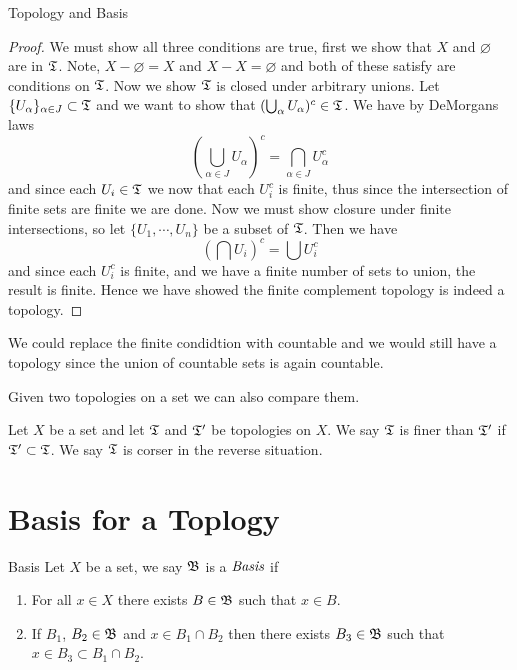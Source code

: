 \begin{chapter}{Topology and Basis}
    
    \begin{proof}
        We must show all three conditions are true, first we show that $X$ and $\varnothing$ are in $\mathfrak{T}$. Note, $X-\varnothing = X$ and $X - X = \varnothing$ and both of 
        these satisfy are conditions on $\mathfrak{T}$. Now we show $\mathfrak{T}$ is closed under arbitrary unions. Let $\{U_\alpha\}_{\alpha \in J} \subset \mathfrak{T}$ and we want to show that 
        $(\bigcup_{\alpha} U_\alpha)^c \in \mathfrak{T}$. We have by DeMorgans laws 
        \[(\bigcup_{\alpha \in J} U_\alpha)^c = \bigcap_{\alpha \in J} U_\alpha^c \]
        and since each $U_i \in \mathfrak{T}$ we now that each $U_i^c$ is finite, thus since the intersection of finite sets are finite we are done. Now we must show closure under finite 
        intersections, so let $\{U_1, \dotsb, U_n \}$ be a subset of $\mathfrak{T}$. Then we have 
        \[(\bigcap U_i)^c = \bigcup U_i^c \]
        and since each $U_i^c$ is finite, and we have a finite number of sets to union, the result is finite. Hence we have showed the finite complement topology is indeed a 
        topology. 
    \end{proof}

    We could replace the finite condidtion with countable and we would still have a topology since the union of countable sets is again 
    countable. 

    Given two topologies on a set we can also compare them. 
    
    \begin{defn}
        Let $X$ be a set and let $\mathfrak{T}$ and $\mathfrak{T}^\prime$ be topologies on $X$. We say $\mathfrak{T}$ is finer than $\mathfrak{T}^\prime$ if 
        $\mathfrak{T}^\prime \subset \mathfrak{T}$. We say $\mathfrak{T}$ is corser in the reverse situation. 
    \end{defn}

    \section{Basis for a Toplogy}
    
    \begin{defn}{Basis}
        Let $X$ be a set, we say $\mathfrak{B}$ is a $\emph{Basis}$ if 
        
        \begin{enumerate}
            \item For all $x \in X$ there exists $B \in \mathfrak{B}$ such that $x \in B $.
            \item If $B_1$, $B_2 \in \mathfrak{B}$ and $x \in B_1 \cap B_2$ then there exists $B_3 \in \mathfrak{B}$ such that $x \in B_3 \subset B_1 \cap B_2$. 
        \end{enumerate}


\end{defn}
\end{chapter}
